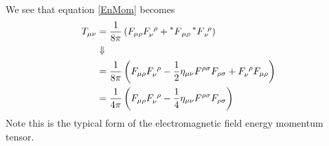 \documentclass[11pt]{article}
\numberwithin{equation}{section}
\begin{document}
\begin{enumerate}[(a)]
\begin{align*}
    \end{align*}
    We see that equation \ref{EnMom} becomes
    \begin{align*}
        T_{\mu\nu} &= \frac{1}{8\pi}\left(F_{\mu\rho}F^{\ \rho}_{\nu} + \prescript{*}{}{F}_{\mu\rho}\prescript{*}{}{F}^{\ \rho}_{\nu}\right)\\
                   &\Downarrow\\
                   &= \frac{1}{8\pi}\left(F_{\mu\rho}F^{\ \rho}_{\nu} - \frac{1}{2}\eta_{\mu\nu}F^{\rho\sigma}F_{\rho\sigma} + F^{\ \rho}_{\nu}F_{\mu\rho}\right)\\
                   &= \frac{1}{4\pi}\left(F_{\mu\rho}F^{\ \rho}_{\nu} - \frac{1}{4}\eta_{\mu\nu}F^{\rho\sigma}F_{\rho\sigma} \right)\\
    \end{align*}
    Note this is the typical form of the electromagnetic field energy momentum tensor.


\end{enumerate}
\end{document}
